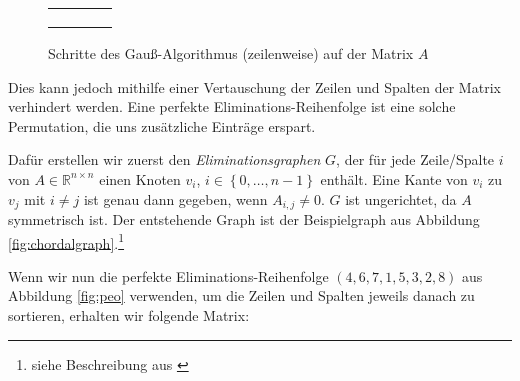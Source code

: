 \begin{figure}
	\begin{tabular}{cccc}
		\spymatrix{\matrixdefaulta} & \spymatrix{\matrixdefaultb} & \spymatrix{\matrixdefaultc} & \spymatrix{\matrixdefaultd} \\
		\multicolumn{4}{c}{\vspace{0.1cm}}                                                                                    \\
		\spymatrix{\matrixdefaulte} & \spymatrix{\matrixdefaultf} & \spymatrix{\matrixdefaultg} & \spymatrix{\matrixdefaulth}
	\end{tabular}
	\caption{Schritte des Gauß-Algorithmus (zeilenweise) auf der Matrix \( A \)}
	\label{fig:gauss01}
\end{figure}

Dies kann jedoch mithilfe einer Vertauschung der Zeilen und Spalten der Matrix verhindert werden. Eine perfekte Eliminations-Reihenfolge ist eine solche Permutation, die uns zusätzliche Einträge erspart.

Dafür erstellen wir zuerst den \textit{Eliminationsgraphen} \( G \), der für jede Zeile/Spalte \( i \) von \( A \in \mathbb{R}^{n \times n}\) einen Knoten \( v_i \), \( i \in \left\lbrace 0, \ldots, n - 1 \right\rbrace \) enthält. Eine Kante von \( v_i \) zu \( v_j \) mit \( i \neq j \) ist genau dann gegeben, wenn \( A_{i,j} \neq 0 \). \( G \) ist ungerichtet, da \( A \) symmetrisch ist. Der entstehende Graph ist der Beispielgraph aus Abbildung \ref{fig:chordalgraph}.\footnote{siehe Beschreibung aus \cite{algorithmic}}

Wenn wir nun die perfekte Eliminations-Reihenfolge \( \left( 4, 6, 7, 1, 5, 3, 2, 8 \right) \) aus Abbildung \ref{fig:peo} verwenden, um die Zeilen und Spalten jeweils danach zu sortieren, erhalten wir folgende Matrix:

